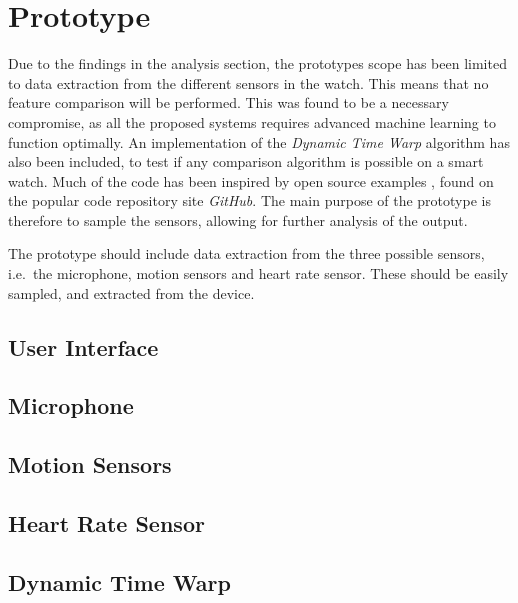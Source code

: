 \section{Prototype}
Due to the findings in the analysis section, the prototypes scope has been
limited to data extraction from the different sensors in the watch. This means
that no feature comparison will be performed. This was found to be a necessary
compromise, as all the proposed systems requires advanced machine learning to
function optimally. An implementation of the \textit{Dynamic Time Warp}
algorithm has also been included, to test if any comparison algorithm is
possible on a smart watch. Much of the code has been inspired by open source
examples \cite{watchosheartratesamplerepo} \cite{healthkitheartrateexporter} 
\cite{watchossampler}, found on the popular code repository site \textit{GitHub}.
The main purpose of the prototype is therefore to sample the sensors, allowing
for further analysis of the output.

The prototype should include data extraction from the three possible sensors,
    i.e.\ the microphone, motion sensors and heart rate sensor. These should be
easily sampled, and extracted from the device. 

\subsection{User Interface}

\subsection{Microphone}

\subsection{Motion Sensors}

\subsection{Heart Rate Sensor}

\subsection{Dynamic Time Warp}

